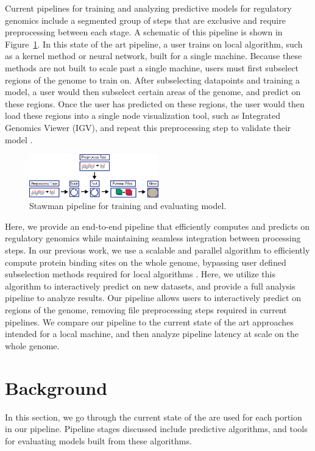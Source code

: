 \documentclass{sig-alternate-05-2015}
\begin{document}
Current pipelines for training and analyzing predictive models for regulatory genomics include a segmented group of steps that are exclusive and require preprocessing between each stage. A schematic of this pipeline is shown in Figure~\ref{fig:strawmanPipeline}. In this state of the art pipeline, a user trains on local algorithm, such as a kernel method or neural network, built for a single machine. Because these methods are not built to scale past a single machine, users must first subselect regions of the genome to train on. After subselecting datapoints and training a model, a user would then subselect certain areas of the genome, and predict on these regions. Once the user has predicted on these regions, the user would then load these regions into a single node visualization tool, such as Integrated Genomics Viewer (IGV), and repeat this preprocessing step to validate their model \cite{igv2011}. \\

\begin{figure}
  \label{fig:strawmanPipeline}
  \includegraphics[width=0.5\textwidth]{figures/strawman.png}
  \caption{Stawman pipeline for training and evaluating model.}
\end{figure}

Here, we provide an end-to-end pipeline that efficiently computes and predicts on regulatory genomics while maintaining seamless integration between processing steps. In our previous work, we use a scalable and parallel algorithm to efficiently compute protein binding sites on the whole genome, bypassing user defined subselection methods required for local algorithms \cite{tfbinding}. Here, we utilize this algorithm to interactively predict on new datasets, and provide a full analysis pipeline to analyze results. Our pipeline allows users to interactively predict on regions of the genome, removing file preprocessing steps required in current pipelines. We compare our pipeline to the current state of the art approaches intended for a local machine, and then analyze pipeline latency at scale on the whole genome.

\section{Background}
In this section, we go through the current state of the are used for each portion in our pipeline. Pipeline stages discussed include predictive algorithms, and tools for evaluating models built from these algorithms.
\end{document}
